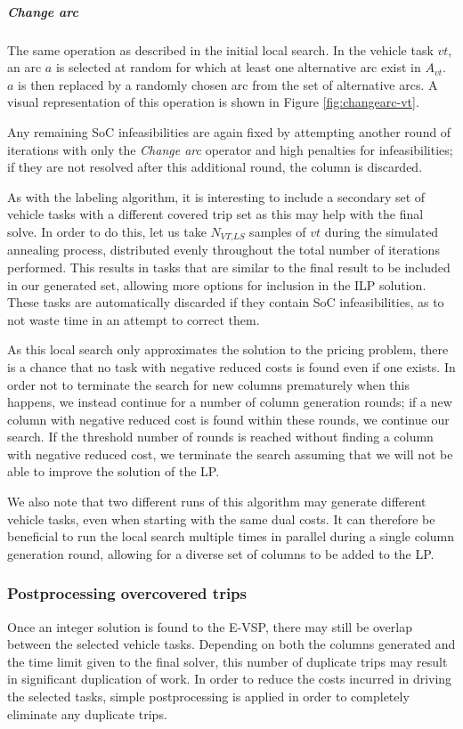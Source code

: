 \documentclass[]{article}
\begin{document}
\subparagraph{Change arc} The same operation as described in the initial local search. In the vehicle task $vt$, an arc $a$ is selected at random for which at least one alternative arc exist in $A_{vt}$. $a$ is then replaced by a randomly chosen arc from the set of alternative arcs. A visual representation of this operation is shown in Figure \ref{fig:changearc-vt}. 

\noindent Any remaining SoC infeasibilities are again fixed by attempting another round of iterations with only the \textit{Change arc} operator and high penalties for infeasibilities; if they are not resolved after this additional round, the column is discarded. 

As with the labeling algorithm, it is interesting to include a secondary set of vehicle tasks with a different covered trip set as this may help with the final solve. In order to do this, let us take $N_{\textit{VT,LS}}$ samples of $vt$ during the simulated annealing process, distributed evenly throughout the total number of iterations performed. This results in tasks that are similar to the final result to be included in our generated set, allowing more options for inclusion in the ILP solution. These tasks are automatically discarded if they contain SoC infeasibilities, as to not waste time in an attempt to correct them.

As this local search only approximates the solution to the pricing problem, there is a chance that no task with negative reduced costs is found even if one exists. In order not to terminate the search for new columns prematurely when this happens, we instead continue for a number of column generation rounds; if a new column with negative reduced cost is found within these rounds, we continue our search. If the threshold number of rounds is reached without finding a column with negative reduced cost, we terminate the search assuming that we will not be able to improve the solution of the LP.

We also note that two different runs of this algorithm may generate different vehicle tasks, even when starting with the same dual costs. It can therefore be beneficial to run the local search multiple times in parallel during a single column generation round, allowing for a diverse set of columns to be added to the LP. 

\subsubsection{Postprocessing overcovered trips} \label{sec:evsp-postprocessing}
Once an integer solution is found to the E-VSP, there may still be overlap between the selected vehicle tasks. Depending on both the columns generated and the time limit given to the final solver, this number of duplicate trips may result in significant duplication of work. In order to reduce the costs incurred in driving the selected tasks, simple postprocessing is applied in order to completely eliminate any duplicate trips. 
\end{document}
